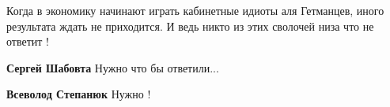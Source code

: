  
 
 
 
 
\zzSecCmt

\begin{itemize} %

Когда в экономику начинают играть кабинетные идиоты аля Гетманцев, иного
результата ждать не приходится. И ведь никто из этих сволочей низа что не
ответит !


\textbf{Сергей Шабовта} Нужно что бы ответили...

\textbf{Всеволод Степанюк} Нужно !

\end{itemize} %
